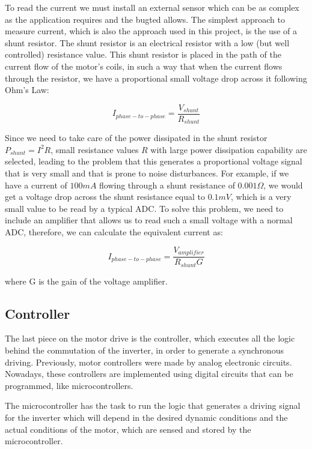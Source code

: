 To read the current we must install an external sensor which can be as complex as the application requires and the bugted allows. The simplest approach to measure current, which is also the approach used in this project, is the use of a shunt resistor. The shunt resistor is an electrical resistor with a low (but well controlled) resistance value. This shunt resistor is placed in the path of the current flow of the motor's coils, in such a way that when the current flows through the resistor, we have a proportional small voltage drop across it following Ohm's Law:

\begin{equation}\label{ohm_shunt}
	I_{phase-to-phase} = \frac{V_{shunt}}{R_{shunt}}
\end{equation}

Since we need to take care of the power dissipated in the shunt resistor $P_{shunt} = I^{2}R$, small resistance values $R$ with large power dissipation capability are selected, leading to the problem that this generates a proportional voltage signal that is very small and that is prone to noise disturbances. For example, if we have a current of $100 mA$ flowing through a shunt resistance of $0.001 \Omega$, we would get a voltage drop across the shunt resistance equal to $0.1 mV$, which is a very small value to be read by a typical \acf{ADC}. To solve this problem, we need to include an amplifier that allows us to read such a small voltage with a normal \ac{ADC}, therefore, we can calculate the equivalent current as:

\begin{equation}\label{ohm_shunt}
	I_{phase-to-phase} = \frac{V_{amplifier}}{R_{shunt}G}
\end{equation}

where G is the gain of the voltage amplifier.

\subsection{Controller}

The last piece on the motor drive is the controller, which executes all the logic behind the commutation of the inverter, in order to generate a synchronous driving. Previously, motor controllers were made by analog electronic circuits. Nowadays, these controllers are implemented using digital circuits that can be programmed, like microcontrollers.

The microcontroller has the task to run the logic that generates a driving signal for the inverter which will depend in the desired dynamic conditions and the actual conditions of the motor, which are sensed and stored by the microcontroller.

